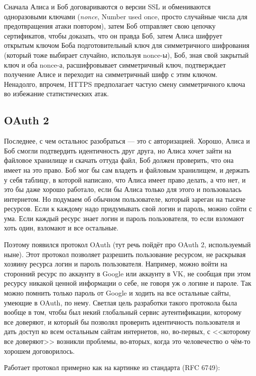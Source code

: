\documentclass[a5paper]{article}
\begin{document}
Сначала Алиса и Боб договариваются о версии SSL и обмениваются одноразовыми ключами (\textit{nonce}, Number used once, просто случайные числа для предотвращения атаки повтором), затем Боб отправляет свою цепочку сертификатов, чтобы доказать, что он правда Боб, затем Алиса шифрует открытым ключом Боба подготовительный ключ для симметричного шифрования (который тоже выбирает случайно, используя nonce-ы), Боб, зная свой закрытый ключ и оба nonce-а, расшифровывает симметричный ключ, подтверждает получение Алисе и переходит на симметричный шифр с этим ключом. Ненадолго, впрочем, HTTPS предполагает частую смену симметричного ключа во избежание статистических атак.

\subsection{OAuth 2}

Последнее, с чем остальнос разобраться --- это с авторизацией. Хорошо, Алиса и Боб смогли подтвердить идентичность друг друга, но Алиса хочет зайти на файловое хранилище и скачать оттуда файл, Боб должен проверить, что она имеет на это право. Боб мог бы сам владеть и файловым хранилищем, и держать у себя таблицу, в которой написано, что Алиса имеет право делать, а что нет, и это бы даже хорошо работало, если бы Алиса только для этого и пользовалась интернетом. Но подумаем об обычном пользователе, который зареган на тысяче ресурсов. Если к каждому надо придумывать свой логин и пароль, можно сойти с ума. Если каждый ресурс знает логин и пароль пользователя, то если взломают хоть один, взломают и все остальные.

Поэтому появился протокол OAuth (тут речь пойдёт про OAuth 2, используемый ныне). Этот протокол позволяет разрешить пользование ресурсом, не раскрывая хозяину ресурса логин и пароль пользователя. Например, можно войти на сторонний ресурс по аккаунту в Google или аккаунту в VK, не сообщая при этом ресурсу никакой ценной информации о себе, не говоря уж о логине и пароле. Так можно помнить только пароль от Google и ходить на все остальные сайты, умеющие в OAuth, по нему. Светлая цель разработки такого протокола была вообще в том, чтобы был некий глобальный сервис аутентификации, которому все доверяют, и который бы позволял проверить идентичность пользователя и дать доступ ко всем остальным сайтам интернетов, но, во-первых, с <<которому все доверяют>> возникли проблемы, во-вторых, когда это человечество о чём-то хорошем договорилось.

Работает протокол примерно как на картинке из стандарта (RFC 6749):
\end{document}
